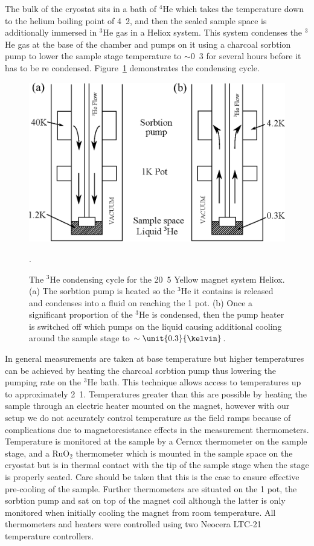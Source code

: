The bulk of the cryostat sits in a bath of $^4$He which takes the temperature down to the helium boiling point of \unit{4.2}{\kelvin}, and then the sealed sample space is additionally immersed in $^3$He gas in a Heliox system. This system condenses the $^3$He gas at the base of the chamber and pumps on it using a charcoal sorbtion pump to lower the sample stage temperature to $\sim$\unit{0.3}{\kelvin} for several hours before it has to be re condensed. Figure~\ref{Fig:Exp:YellowFridge} demonstrates the condensing cycle.
\begin{figure}[htbp]
    \begin{center}
        \includegraphics[scale=0.6]{Chapter-ExperimentalTechnique/Figures/YellowFridge/YellowFridge}
        \caption{The $^3$He condensing cycle for the \unit{20.5}{\tesla} Yellow magnet system Heliox. (a) The sorbtion pump is heated so the $^3$He it contains is released and condenses into a fluid on reaching the \unit{1}{\kelvin} pot. (b) Once a significant proportion of the $^3$He is condensed, then the pump heater is switched off which pumps on the liquid causing additional cooling around the sample stage to $\sim\unit{0.3}{\kelvin}$.}.
        \label{Fig:Exp:YellowFridge}
    \end{center}
\end{figure}
 In general measurements are taken at base temperature but higher temperatures can be achieved by heating the charcoal sorbtion pump thus lowering the pumping rate on the $^3$He bath. This technique allows access to temperatures up to approximately \unit{2.1}{\kelvin}. Temperatures greater than this are possible by heating the sample through an electric heater mounted on the magnet, however with our setup we do not accurately control temperature as the field ramps because of complications due to magnetoresistance effects in the measurement thermometers. Temperature is monitored at the sample by a Cernox thermometer on the sample stage, and a RuO$_2$ thermometer which is mounted in the sample space on the cryostat but is in thermal contact with the tip of the sample stage when the stage is properly seated. Care should be taken that this is the case to ensure effective pre-cooling of the sample. Further thermometers are situated on the \unit{1}{\kelvin} pot, the sorbtion pump and sat on top of the magnet coil although the latter is only monitored when initially cooling the magnet from room temperature. All thermometers and heaters were controlled using two Neocera LTC-21 temperature controllers.

